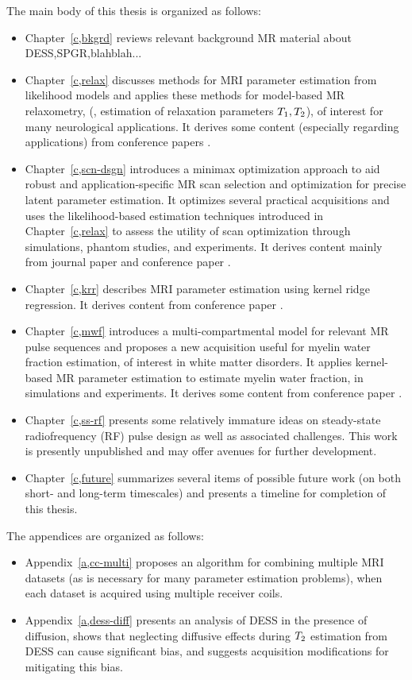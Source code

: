 The main body of this thesis is organized as follows:
\begin{itemize}
\item 
	Chapter~\ref{c,bkgrd} reviews 
	relevant background MR material
	about DESS,SPGR,blahblah...
\item 
	Chapter~\ref{c,relax} discusses methods 
	for MRI parameter estimation 
	from likelihood models 
	and applies these methods 
	for model-based MR relaxometry, 
	(\ie, estimation of relaxation parameters $T_1,T_2$),
	of interest for many neurological applications.
	It derives some content 
	(especially regarding applications)
	from conference papers 
	\cite{nataraj:14:rje,nataraj:14:mbe}.
\item
	Chapter~\ref{c,scn-dsgn} introduces
	a minimax optimization approach
	to aid robust and application-specific 
	MR scan selection and optimization 
	for precise latent parameter estimation.
	It optimizes several practical acquisitions 
	and uses the likelihood-based estimation techniques 
	introduced in Chapter~\ref{c,relax}
	to assess the utility
	of scan optimization
	through simulations, 
	phantom studies, 
	and \invivo experiments.
	It derives content
	mainly from journal paper
	\cite{nataraj::oms}
	and conference paper
	\cite{nataraj:15:amm}.
\item 
	Chapter~\ref{c,krr} describes 
	MRI parameter estimation
	using kernel ridge regression.
	It derives content 
	from conference paper
	\cite{nataraj:17:dfm}.
\item
	Chapter~\ref{c,mwf} introduces a multi-compartmental model
	for relevant MR pulse sequences
	and proposes a new acquisition 
	useful for myelin water fraction estimation,
	of interest in white matter disorders.
	It applies kernel-based MR parameter estimation
	to estimate myelin water fraction,
	in simulations and \invivo experiments.
	It derives some content from conference paper
	\cite{nataraj:17:mwf}.
\item
	Chapter~\ref{c,ss-rf} presents
	some relatively immature ideas
	on steady-state radiofrequency (RF) pulse design
	as well as associated challenges.
	This work is presently unpublished
	and may offer avenues for further development.
\item 
	Chapter~\ref{c,future} summarizes several items 
	of possible future work
	(on both short- and long-term timescales) 
	and presents a timeline
	for completion of this thesis.
\end{itemize}

The appendices are organized as follows:
\begin{itemize}
\item
	Appendix~\ref{a,cc-multi} proposes an algorithm
	for combining multiple MRI datasets
	(as is necessary for many parameter estimation problems),
	when each dataset is acquired 
	using multiple receiver coils.
\item
	Appendix~\ref{a,dess-diff} presents an analysis
	of DESS in the presence of diffusion,
	shows that neglecting diffusive effects
	during $T_2$ estimation from DESS
	can cause significant bias,
	and suggests acquisition modifications
	for mitigating this bias.
\end{itemize}

